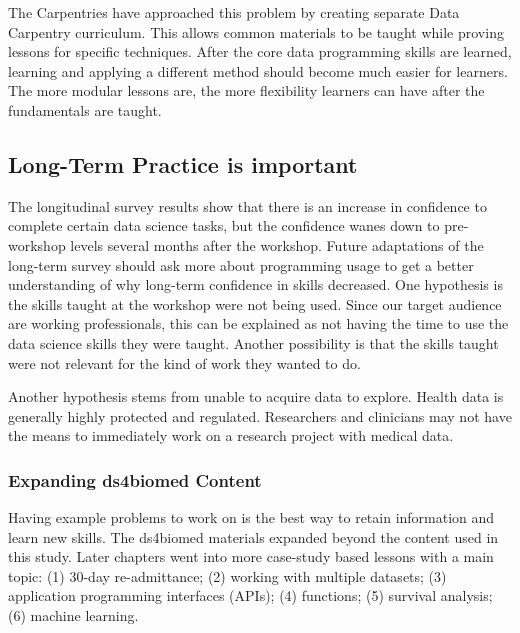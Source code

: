 \documentclass[030-workshop.tex]{subfiles}
\begin{document}
        The Carpentries have approached this problem by creating separate Data Carpentry curriculum.
        This allows common materials to be taught while proving lessons for specific techniques.
        After the core data programming skills are learned,
        learning and applying a different method should become much easier for learners.
        The more modular lessons are, the more flexibility learners can have after the fundamentals are taught.

    \subsection{Long-Term Practice is important}

        The longitudinal survey results show that there is an increase in confidence to complete certain data science tasks,
        but the confidence wanes down to pre-workshop levels several months after the workshop.
        Future adaptations of the long-term survey should ask more about programming usage to get a better understanding
        of why long-term confidence in skills decreased.
        One hypothesis is the skills taught at the workshop were not being used.
        Since our target audience are working professionals,
        this can be explained as not having the time to use the data science skills they were taught.
        Another possibility is that the skills taught were not relevant for the kind of work they wanted to do.

        Another hypothesis stems from unable to acquire data to explore.
        Health data is generally highly protected and regulated.
        Researchers and clinicians may not have the means to immediately work on a research project with medical data.

    \subsubsection{Expanding ds4biomed Content}

        Having example problems to work on is the best way to retain information and learn new skills.
        The ds4biomed materials expanded beyond the content used in this study.
        Later chapters went into more case-study based lessons with a main topic:
        (1) 30-day re-admittance;
        (2) working with multiple datasets;
        (3) application programming interfaces (APIs);
        (4) functions;
        (5) survival analysis;
        (6) machine learning.
\end{document}
